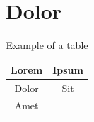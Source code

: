 \lipsum[4]

\section{Dolor}
\lipsum[3]

\begin{table}
\centering
\begin{tabular}{|c|c|}
\hline
\textbf{Lorem} & \textbf{Ipsum} \\
\hline
\hline
Dolor & Sit \\
\hline
Amet &  \\
\hline
\end{tabular}
\caption{Example of a table}
\label{tab:example}
\end{table}

\lipsum[4-5]